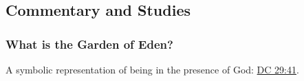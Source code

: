 	
	
	
\subsection{Commentary and Studies} %
	\label{GARDENOFEDEN-COMMENTARY}

	
		
	\subsubsection{What is the Garden of Eden?}
		\label{GARDENOFEDEN-definition}
		
		\begin{compactitem}
			\item A symbolic representation of being in the presence of God: \hyperref[DC29-41]{DC 29:41}.
		\end{compactitem}